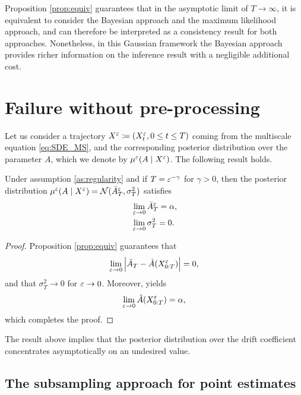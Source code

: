 \documentclass[10pt]{article}
\begin{document}
\begin{remark} Proposition \ref{prop:equiv} guarantees that in the asymptotic limit of $T \to \infty$, it is equivalent to consider the Bayesian approach and the maximum likelihood approach, and can therefore be interpreted as a consistency result for both approaches. Nonetheless, in this Gaussian framework the Bayesian approach provides richer information on the inference result with a negligible additional cost.
\end{remark}

\section{Failure without pre-processing}

Let us consider a trajectory $X^\varepsilon \coloneqq (X_t^\varepsilon, 0 \leq t \leq T)$ coming from the multiscale equation \eqref{eq:SDE_MS}, and the corresponding posterior distribution over the parameter $A$, which we denote by $\mu^\varepsilon(A \mid X^\varepsilon)$. The following result holds.
\begin{theorem} Under assumption \ref{as:regularity} and if $T = \varepsilon^{-\gamma}$ for $\gamma > 0$, then the posterior distribution $\mu^\varepsilon(A \mid X^\varepsilon) = \mathcal N(\bar A^\varepsilon_T,  \sigma^2_T)$ satisfies
	\begin{equation}
	\begin{aligned}
	&\lim_{\varepsilon \to 0} \bar A^\varepsilon_T = \alpha, \\
	&\lim_{\varepsilon \to 0} \sigma^2_T = 0.
	\end{aligned}
	\end{equation}
\end{theorem}
\begin{proof} Proposition \ref{prop:equiv} guarantees that 
	\begin{equation}
	\lim_{\varepsilon \to 0} \left\lvert\bar A_T - \hat A(X^\varepsilon_{0:T})\right\rvert = 0,
	\end{equation}
	and that $\sigma^2_T \to 0$ for $\varepsilon \to 0$. Moreover, \cite[Theorem 3.4]{PaS07} yields
	\begin{equation}
	\lim_{\varepsilon \to 0} \hat A(X^\varepsilon_{0:T}) = \alpha,
	\end{equation}
	which completes the proof.
\end{proof}

The result above implies that the posterior distribution over the drift coefficient concentrates asymptotically on an undesired value.

\subsection{The subsampling approach for point estimates}
\end{document}
